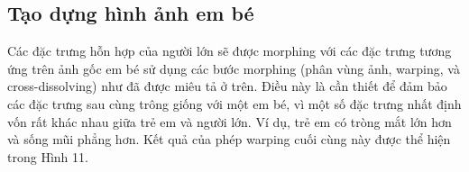 \documentclass[journal]{IEEEtran}
\begin{document}
\subsection{Tạo dựng hình ảnh em bé}
Các đặc trưng hỗn hợp của người lớn sẽ được morphing với các đặc trưng tương ứng trên ảnh gốc em bé sử dụng các bước morphing (phân vùng ảnh, warping, và cross-dissolving) như đã được miêu tả ở trên. Điều này là cần thiết để đảm bảo các đặc trưng sau cùng trông giống với một em bé, vì một số đặc trưng nhất định vốn rất khác nhau giữa trẻ em và người lớn. Ví dụ, trẻ em có tròng mắt lớn hơn và sống mũi phẳng hơn. Kết quả của phép warping cuối cùng này được thể hiện trong Hình 11.
\begin{figure}[!t]
\centering
{}

\end{figure}
\end{document}
